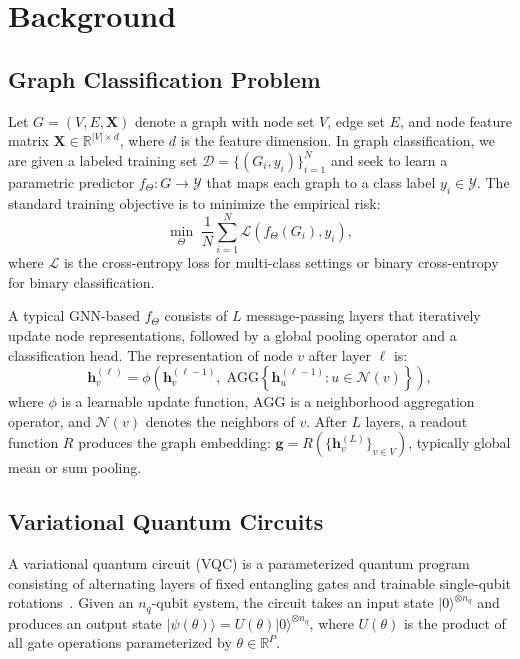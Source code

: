 \documentclass[journal]{IEEEtran}
\begin{document}
\section{Background}
\label{sec:background}

\subsection{Graph Classification Problem}

Let $G = (V, E, \mathbf{X})$ denote a graph with node set $V$, edge set $E$,
and node feature matrix $\mathbf{X} \in \mathbb{R}^{|V| \times d}$, where
$d$ is the feature dimension. In graph classification, we are given a labeled
training set $\mathcal{D} = \{(G_i, y_i)\}_{i=1}^N$ and seek to learn a
parametric predictor $f_\Theta: G \to \mathcal{Y}$ that maps each graph to
a class label $y_i \in \mathcal{Y}$. The standard training objective is to
minimize the empirical risk:
\begin{equation}
  \min_\Theta \;\frac{1}{N}\sum_{i=1}^N \mathcal{L}\!\left(f_\Theta(G_i), y_i\right),
  \label{eq:obj}
\end{equation}
where $\mathcal{L}$ is the cross-entropy loss for multi-class settings or
binary cross-entropy for binary classification.

A typical GNN-based $f_\Theta$ consists of $L$ message-passing layers that
iteratively update node representations, followed by a global pooling
operator and a classification head. The representation of node $v$ after
layer $\ell$ is:
\begin{equation}
  \mathbf{h}_v^{(\ell)} = \phi\!\left(\mathbf{h}_v^{(\ell-1)},\;
  \text{AGG}\!\left\{\mathbf{h}_u^{(\ell-1)} : u \in \mathcal{N}(v)\right\}\right),
  \label{eq:gnn}
\end{equation}
where $\phi$ is a learnable update function, $\text{AGG}$ is a neighborhood
aggregation operator, and $\mathcal{N}(v)$ denotes the neighbors of $v$.
After $L$ layers, a readout function $R$ produces the graph embedding:
$\mathbf{g} = R\!\left(\{\mathbf{h}_v^{(L)}\}_{v \in V}\right)$, typically
global mean or sum pooling.

\subsection{Variational Quantum Circuits}

A variational quantum circuit (VQC) is a parameterized quantum program
consisting of alternating layers of fixed entangling gates and trainable
single-qubit rotations~\cite{Cerezo2021}. Given an $n_q$-qubit system,
the circuit takes an input state $|0\rangle^{\otimes n_q}$ and produces
an output state $|\psi(\theta)\rangle = U(\theta)|0\rangle^{\otimes n_q}$,
where $U(\theta)$ is the product of all gate operations parameterized by
$\theta \in \mathbb{R}^P$.
\end{document}
